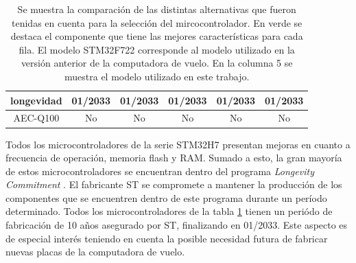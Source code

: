\begin{table}[htb]
\begin{tabular}{|c||c|c|c|c|c|}
        longevidad & \cellcolor{green!25}01/2033 & \cellcolor{green!25}01/2033 & \cellcolor{green!25}01/2033 & \cellcolor{green!25}01/2033 & \cellcolor{green!25}01/2033\\
        \hline
        AEC-Q100 & No & No & No & No & No\\
        \hline       
    \end{tabular}
    \caption{Se muestra la comparación de las distintas alternativas que fueron tenidas en cuenta para la selección del mircocontrolador. En verde se destaca el componente que tiene las mejores características para cada fila. El modelo STM32F722 corresponde al modelo utilizado en la versión anterior de la computadora de vuelo. En la columna 5 se muestra el modelo utilizado en este trabajo.}
    \label{tab:comparacion_MCUs}
\end{table}

Todos los microcontroladores de la serie STM32H7 presentan mejoras en cuanto a frecuencia de operación, memoria flash y RAM. Sumado a esto, la gran mayoría de estos microcontroladores se encuentran dentro del programa \textit{Longevity Commitment} \cite{longevity_ST}. El fabricante ST se compromete a mantener la producción de los componentes que se encuentren dentro de este programa durante un período determinado. Todos los microcontroladores de la tabla \ref{tab:comparacion_MCUs} tienen un periódo de fabricación de 10 años asegurado por ST, finalizando en 01/2033. Este aspecto es de especial interés teniendo en cuenta la posible necesidad futura de fabricar nuevas placas de la computadora de vuelo.




